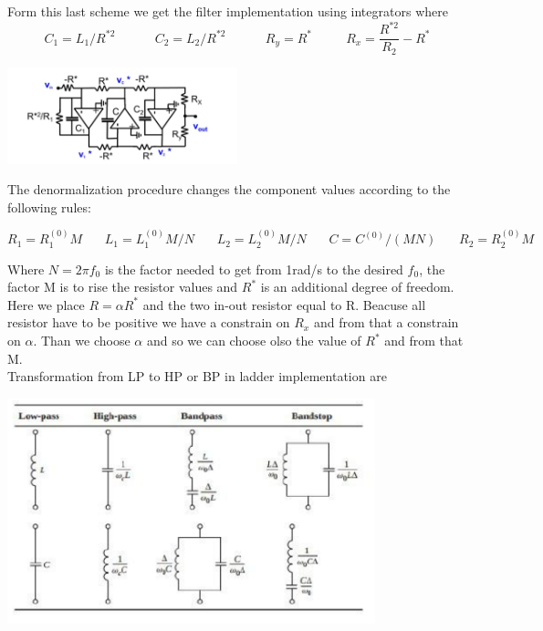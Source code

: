 Form this last scheme we get the filter implementation using integrators where 
\begin{equation}
C_1=L_1/R^{*2} \ \ \ \ \ \ \ \ \ \ \ \ \ \ C_2=L_2/R^{*2}  \ \ \ \ \ \ \ \ \ \ \ \ \ \ R_y=R^* \ \ \ \ \ \ \ \ \ \ \ \ R_x=\frac{R^{*2}}{R_2}-R^*
\end{equation}


\centering
\includegraphics[width=0.5\textwidth]{ldd6.png}\\
\raggedright


The denormalization procedure changes the component values according to the following rules:

\begin{equation}
R_1=R_1^{(0)}M \ \ \ \ \ \ \ \ L_1=L_1^{(0)}M/N \ \ \ \ \ \ \ \ L_2=L_2^{(0)}M/N \ \ \ \ \ \ \ \ C=C^{(0)}/(MN) \ \ \ \ \ \ \ \ R_2=R_2^{(0)}M
\end{equation}

Where $N=2\pi f_0$ is the factor needed to get from 1rad/s to the desired $f_0$, the factor M is to rise the resistor values and $R^*$ is an additional degree of freedom.\\
Here we place $R=\alpha R^*$ and the two in-out resistor equal to R. Beacuse all resistor have to be positive we have a constrain on $R_x$ and from that a constrain on $\alpha$. Than we choose $\alpha $ and so we can choose olso the value of $R^*$ and from that M.\\
\vspace{5mm}
Transformation from LP to HP or BP in ladder implementation are 

\centering
\includegraphics[width=0.8\textwidth]{ld.png}\\
\raggedright


